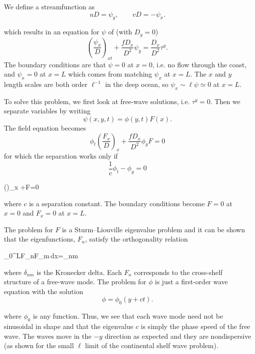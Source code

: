 We define a streamfunction as
\[
	uD=\psi_y,
	\qquad
	vD=-\psi_x.
\]

\sourcepagebreak

which results in an equation for $\psi$ of (with $D_y=0$)
\[
	\left(\frac{\psi_x}{D}\right)_{xt}
	+\frac{fD_x}{D^2}\psi_y
	=\frac{D_x}{D^2}\tau^y.
\]
The boundary conditions are that $\psi=0$ at $x=0$, i.e. no flow through the coast,
and $\psi_x=0$ at $x=L$ which comes from matching $\psi_x$ at $x=L$. The $x$ and
$y$ length scales are both order $\ell^{-1}$ in the deep ocean, so
$\psi_x\sim\ell\psi\simeq0$ at $x=L$.

To solve this problem, we first look at free-wave solutions, i.e. $\tau^y=0$. Then we
separate variables by writing
\[
	\psi(x,y,t)=\phi(y,t)F(x).
\]
The field equation becomes
\[
	\phi_t\left(\frac{F_x}{D}\right)_x
	+\frac{fD_x}{D^2}\phi_yF=0
\]
for which the separation works only if
\[
	\frac{1}{c}\phi_t-\phi_y=0
\]
\begin{waveequation}
	\left(\right)_x
	+F=0
\end{waveequation}
where $c$ is a separation constant. The boundary conditions become $F=0$ at $x=0$
and $F_x=0$ at $x=L$.

The problem for $F$ is a Sturm--Liouville eigenvalue problem and it can be shown that
the eigenfunctions, $F_n$, satisfy the orthogonality relation
\begin{waveequation}
	\int_0^LF_nF_m\,dx=\delta_{nm}
\end{waveequation}
where $\delta_{nm}$ is the Kronecker delta. Each $F_n$ corresponds to the cross-shelf
structure of a free-wave mode. The problem for $\phi$ is just a first-order wave equation
with the solution
\[
	\phi=\phi_0(y+ct).
\]

\sourcepagebreak

where $\phi_0$ is any function. Thus, we see that each wave mode need not be sinusoidal
in shape and that the eigenvalue $c$ is simply the phase speed of the free wave. The
waves move in the $-y$ direction as expected and they are nondispersive (as shown for
the small $\ell$ limit of the continental shelf wave problem).

